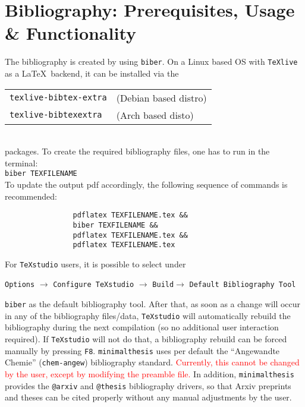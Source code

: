 		\chapter{Bibliography: Prerequisites, Usage \& Functionality}
			The bibliography is created by using \verb|biber|. On a Linux based OS with \verb|TeXlive| as a \LaTeX~backend, it can be installed via the\\[0.125cm]
			\begin{tabular}{ll}
				\verb|texlive-bibtex-extra|& (Debian based distro)\\
				\verb|texlive-bibtexextra|& (Arch based disto)
			\end{tabular}\\
			packages.
			\newline To create the required bibliography files, one has to run in the terminal:\\
			\verb|biber TEXFILENAME|\\
			To update the output pdf accordingly, the following sequence of commands is recommended:\\[-1cm]
			\begin{verbatim}
				pdflatex TEXFILENAME.tex &&
				biber TEXFILENAME &&
				pdflatex TEXFILENAME.tex &&
				pdflatex TEXFILENAME.tex 
			\end{verbatim} 
			\vspace{-0.5cm}
			For \verb|TeXstudio| users, it is possible to select under\\[-1cm]
			\begin{center}
				\verb|Options| $\rightarrow$ 
				\verb|Configure TeXstudio| $\rightarrow$
				\verb|Build|$ \rightarrow$
				\verb|Default Bibliography Tool| 
			\end{center}
			\vspace{-0.5cm}
			\verb|biber| as the default bibliography tool. After that, as soon as a change will occur in any of the bibliography files/data, \verb|TeXstudio| will automatically rebuild the bibliography during the next compilation (so no additional user interaction required). If \verb|TeXstudio| will not do that, a bibliography rebuild can be forced manually by pressing \verb|F8|.
			\newline \verb|minimalthesis| uses per default the \enquote{Angewandte Chemie} (\verb|chem-angew|) bibliography standard. \textcolor{red}{Currently, this cannot be changed by the user, except by modifying the preamble file.} 
			\newline In addition, \verb|minimalthesis| provides the \verb|@arxiv| \cite{arxivExample} and \verb|@thesis| \cite{thesisExample} bibliography drivers, so that Arxiv preprints and theses can be cited properly without any manual adjustments by the user.
			
